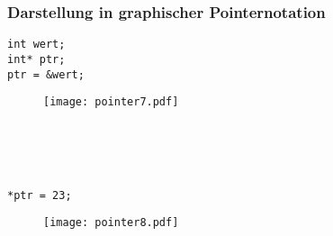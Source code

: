 \subsubsection{Darstellung in graphischer Pointernotation\hfill}
\label{sec:unterunterabschnitt}
\noindent
\begin{minipage}{\linewidth}
\begin{lstlisting}
int wert;
int* ptr;
ptr = &wert;
\end{lstlisting}
\end{minipage}
\begin{figure}[h]
	\centering
	\texttt{[image: pointer7.pdf]}
\end{figure}
\\ \\ \\
\noindent
\begin{minipage}{\linewidth}
\begin{lstlisting}
*ptr = 23;
\end{lstlisting}
\end{minipage}
\begin{figure}[h]
	\centering
	\texttt{[image: pointer8.pdf]}
\end{figure}
\\ \\ \\

